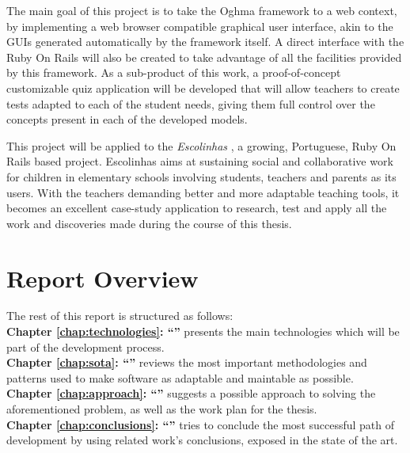 The main goal of this project is to take the Oghma framework \cite{FCA09} to a web context, by implementing a web browser compatible graphical user interface, akin to the GUIs generated automatically by the framework itself. A direct interface with the Ruby On Rails will also be created to take advantage of all the facilities provided by this framework. As a sub-product of this work, a proof-of-concept customizable quiz application will be developed that will allow teachers to create tests adapted to each of the student needs, giving them full control over the concepts present in each of the developed models.

This project will be applied to the \textit{Escolinhas} \cite{escolinhas}, a growing, Portuguese, Ruby On Rails based project. Escolinhas aims at sustaining social and collaborative work for children in elementary schools involving students, teachers and parents as its users. With the teachers demanding better and more adaptable teaching tools, it becomes an excellent case-study application to research, test and apply all the work and discoveries made during the course of this thesis.


\section{Report Overview}\label{sec:structure}

The rest of this report is structured as follows:\\

\textbf{Chapter \ref{chap:technologies}: ``'' } presents the main technologies which will be part of the development process.\\

\textbf{Chapter \ref{chap:sota}: ``'' } reviews the most important methodologies and patterns used to make software as adaptable and maintable as possible.\\

\textbf{Chapter \ref{chap:approach}: ``'' } suggests a possible approach to solving the aforementioned problem, as well as the work plan for the thesis.\\

\textbf{Chapter \ref{chap:conclusions}: ``'' } tries to conclude the most successful path of development by using related work’s conclusions, exposed in the state of the art. %


